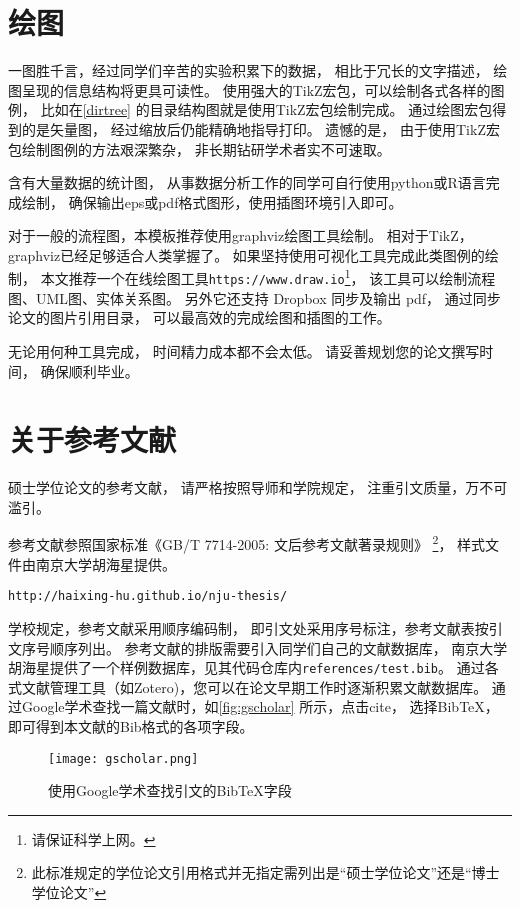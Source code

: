 \section{绘图}\label{how-to-plot}

一图胜千言，经过同学们辛苦的实验积累下的数据，
相比于冗长的文字描述，
绘图呈现的信息结构将更具可读性。
使用强大的TikZ宏包，可以绘制各式各样的图例，
比如在\ref{dirtree} 的目录结构图就是使用TikZ宏包绘制完成。
通过绘图宏包得到的是矢量图，
经过缩放后仍能精确地指导打印。
遗憾的是，
由于使用TikZ宏包绘制图例的方法艰深繁杂，
非长期钻研学术者实不可速取。


含有大量数据的统计图，
从事数据分析工作的同学可自行使用python或R语言完成绘制，
确保输出eps或pdf格式图形，使用插图环境引入即可。

对于一般的流程图，本模板推荐使用graphviz绘图工具绘制。
相对于TikZ，graphviz已经足够适合人类掌握了。
如果坚持使用可视化工具完成此类图例的绘制，
本文推荐一个在线绘图工具\texttt{https://www.draw.io}\footnote{请保证科学上网。}，
该工具可以绘制流程图、UML图、实体关系图。
另外它还支持 Dropbox 同步及输出 pdf，
通过同步论文的图片引用目录，
可以最高效的完成绘图和插图的工作。

无论用何种工具完成，
时间精力成本都不会太低。
请妥善规划您的论文撰写时间，
确保顺利毕业。

\section{关于参考文献}

硕士学位论文的参考文献，
请严格按照导师和学院规定，
注重引文质量，万不可滥引。

参考文献参照国家标准《GB/T 7714-2005: 文后参考文献著录规则》
\footnote{此标准规定的学位论文引用格式并无指定需列出是“硕士学位论文”还是“博士学位论文”}，
样式文件由南京大学胡海星提供。
\begin{verbatim}
http://haixing-hu.github.io/nju-thesis/
\end{verbatim}

学校规定，参考文献采用顺序编码制，
即引文处采用序号标注，参考文献表按引文序号顺序列出。
参考文献的排版需要引入同学们自己的文献数据库，
南京大学胡海星提供了一个样例数据库，见其代码仓库内\texttt{references/test.bib}。
通过各式文献管理工具（如Zotero)，您可以在论文早期工作时逐渐积累文献数据库。
通过Google学术查找一篇文献时，如\autoref{fig:gscholar} 所示，点击cite，
选择BibTeX，即可得到本文献的Bib格式的各项字段。
\begin{figure}[htbp]
    \centering
    \texttt{[image: gscholar.png]}
    \caption{使用Google学术查找引文的BibTeX字段}
    \label{fig:gscholar}
\end{figure}

